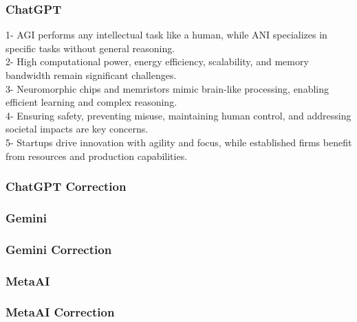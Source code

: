 \subsubsection{ChatGPT}
\begin{tcolorbox}[breakable]
    1- AGI performs any intellectual task like a human, while ANI specializes in specific tasks without general reasoning.\\
2- High computational power, energy efficiency, scalability, and memory bandwidth remain significant challenges.\\
3- Neuromorphic chips and memristors mimic brain-like processing, enabling efficient learning and complex reasoning.\\
4- Ensuring safety, preventing misuse, maintaining human control, and addressing societal impacts are key concerns.\\
5- Startups drive innovation with agility and focus, while established firms benefit from resources and production capabilities.

\end{tcolorbox}
\subsubsection{ChatGPT Correction}
\begin{tcolorbox}[breakable]
    
\end{tcolorbox}
\subsubsection{Gemini}
\begin{tcolorbox}[breakable]
\end{tcolorbox}
\subsubsection{Gemini Correction}
\begin{tcolorbox}[breakable]
    
\end{tcolorbox}
\subsubsection{MetaAI}
\begin{tcolorbox}[breakable]
    
\end{tcolorbox}
\subsubsection{MetaAI Correction}
\begin{tcolorbox}[breakable]
    
\end{tcolorbox}


